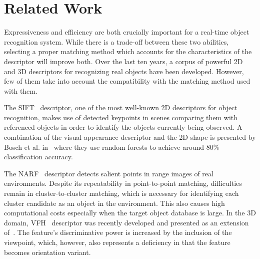 \documentclass[a4paper, 10 pt, conference]{sty/ieeeconf}
\begin{document}
\section{Related Work}
\label{sec:rl}
Expressiveness and efficiency 
 are both crucially important for
a real-time object recognition system.  While there is a trade-off between
these two abilities, selecting a
proper matching method which accounts for the characteristics of the
descriptor will improve both. 
Over the last ten years, a corpus of powerful 2D and 3D descriptors for
recognizing real objects have been developed. However, few of them take into
account the compatibility with the matching method used with them.

The SIFT~\cite{lowe04distinctive} descriptor, one of the most well-known 2D
descriptors for object recognition, makes use of detected keypoints in
scenes comparing them with referenced objects in order to identify the
objects currently being observed. A combination of the visual appearance
descriptor and the 2D shape is presented by Bosch et al. in~\cite{Bosch07shape}
where they use random forests to achieve around 80\% classification 
accuracy. 

The NARF~\cite{steder10irosws} descriptor detects salient points in range images of
real environments. Despite its 
repeatability in point-to-point matching, difficulties remain in
cluster-to-cluster matching, which is necessary for identifying each cluster
candidate as an object in the environment. This also causes high computational costs
especially when the target object database is large. In the 3D domain, VFH~\cite{vfh} descriptor was recently developed and presented as an extension 
of~\cite{Rusu09ICRA}. The feature's discriminative power is increased
by the inclusion of the viewpoint, which, however, also represents
a deficiency in that the feature becomes orientation variant. 
\end{document}
